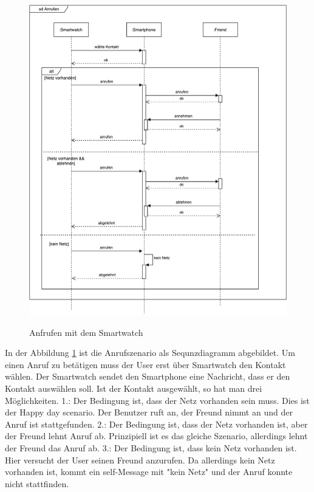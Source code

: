\begin{figure}[H]
\centering\
\includegraphics[width=13cm]{img/AnrufenSequenz}
\caption{Anfrufen mit dem Smartwatch}\label{fig:anruf}
\end{figure}

In der Abbildung \ref{fig:anruf} ist die Anrufszenario als Sequnzdiagramm abgebildet.
Um einen Anruf zu betätigen muss der User erst über Smartwatch den Kontakt wählen. Der Smartwatch sendet den Smartphone eine Nachricht, dass er den Kontakt auswählen soll. Ist der Kontakt ausgewählt, so hat man drei Möglichkeiten.
1.: Der Bedingung ist, dass der Netz vorhanden sein muss. Dies ist der Happy day scenario. Der Benutzer ruft an, der Freund nimmt an und der Anruf ist stattgefunden.
2.: Der Bedingung ist, dass der Netz vorhanden ist, aber der Freund lehnt Anruf ab. Prinzipiell ist es das gleiche Szenario, allerdings lehnt der Freund das Anruf ab.
3.: Der Bedingung ist, dass kein Netz vorhanden ist. Hier versucht der User seinen Freund anzurufen. Da allerdings kein Netz vorhanden ist, kommt ein self-Message mit "kein Netz" und der Anruf konnte nicht stattfinden.





